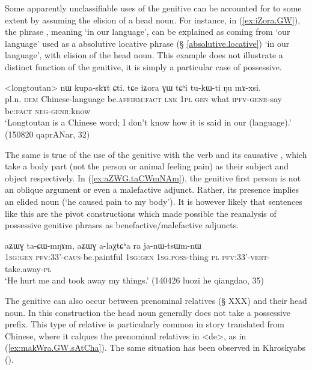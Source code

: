 Some apparently unclassifiable uses of the genitive can be accounted for to some extent by assuming the elision of a head noun.  For instance, in (\ref{ex:iZora.GW}), the phrase , meaning `in our language', can be explained as coming from  `our language' used as a absolutive locative phrase (§ \ref{absolutive.locative}) `in our language', with elision of the head noun. This example does not illustrate a distinct function of the genitive, it is simply a particular case of possessive.

\begin{exe}
\ex \label{ex:iZora.GW}
\gll  <longtoutan> nɯ kupa-skɤt ɕti. tɕe iʑora ɣɯ tɕʰi tu-kɯ-ti ŋu mɤ-xsi. \\
pl.n. \textsc{dem} Chinese-language be.\textsc{affirm}:\textsc{fact} \textsc{lnk} \textsc{1pl} \textsc{gen} what \textsc{ipfv}-\textsc{genr}-say be:\textsc{fact} \textsc{neg}-\textsc{genr}:know \\
\glt `Longtoutan is a Chinese word; I don't know how it is said in our (language).'  (150820 qaprANar, 32)
\end{exe}

The same is true of the use of the genitive with the verb  and its causative , which take a body part (not the person or animal feeling pain) as their subject and object respectively. In (\ref{ex:aZWG.taCWmNAm}), the genitive first person  is not an oblique argument or even a malefactive adjunct. Rather, its presence implies an elided noun  (`he caused pain to my body'). It is however likely that sentences like this are the pivot constructions which made possible the reanalysis of possessive genitive phrases as benefactive/malefactive adjuncts.

\begin{exe}
\ex \label{ex:aZWG.taCWmNAm}
\gll aʑɯɣ ta-ɕɯ-mŋɤm, aʑɯɣ a-laχtɕʰa ra ja-nɯ-tsɯm-nɯ \\
\textsc{1sg}:\textsc{gen} \textsc{pfv}:3\fl{}3'-\textsc{caus}-be.paintful \textsc{1sg}:\textsc{gen} \textsc{1sg}.\textsc{poss}-thing \textsc{pl} \textsc{pfv}:3\fl{}3'-\textsc{vert}-take.away-\textsc{pl} \\
\glt `He hurt me and took away my things.' (140426 luozi he qiangdao, 35)
\end{exe}

The genitive can also occur between prenominal relatives (§ XXX) and their head noun. In this construction the head noun generally does not take a possessive prefix. This type of relative is particularly common in story translated from Chinese, where it calques the prenominal relatives in  <de>, as in (\ref{ex:makWra.GW.sAtCha}). The same situation has been observed in Khroskyabs (\citealt[640-643]{lai17khroskyabs}).

